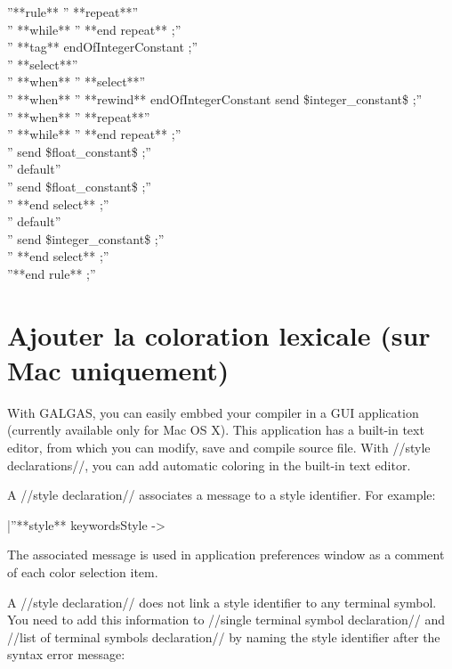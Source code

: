 {''**rule** %
'' **repeat**''\\
'' **while** %
'' **end repeat** ;''\\
'' **tag** endOfIntegerConstant ;''\\
'' **select**''\\
'' **when** %
''  **select**''\\
''  **when** %
''   **rewind** endOfIntegerConstant send \$integer\_constant\$ ;''\\
''  **when** %
''   **repeat**''\\
''   **while** %
''   **end repeat** ;''\\
''   send \$float\_constant\$ ;''\\
''  default''\\
''   send \$float\_constant\$ ;''\\
''  **end select** ;''\\
'' default''\\
''  send \$integer\_constant\$ ;''\\
'' **end select** ;''\\
''**end rule** ;''\\


\section{Ajouter la coloration lexicale (sur Mac uniquement)}

With GALGAS, you can easily embbed your compiler in a GUI application (currently available only for Mac OS X). This application has a built-in text editor, from which you can modify, save and compile source file. With //style declarations//, you can add automatic coloring in the built-in text editor.

A //style declaration// associates a message to a style identifier. For example:

|''**style** keywordsStyle -> %

The associated message is used in application preferences window as a comment of each color selection item.

A //style declaration// does not link a style identifier to any terminal symbol. You need to add this information to //single terminal symbol declaration// and //list of terminal symbols declaration// by naming the style identifier after the syntax error message:

}
